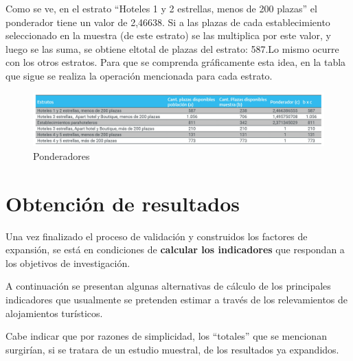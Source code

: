 \documentclass[
]{book}
\begin{document}
Como se ve, en el estrato ``Hoteles 1 y 2 estrellas, menos de 200 plazas'' el ponderador tiene un valor de 2,46638. Si a las plazas de cada establecimiento seleccionado en la muestra (de este estrato) se las multiplica por este valor, y luego se las suma, se obtiene eltotal de plazas del estrato: 587.Lo mismo ocurre con los otros estratos. Para que se comprenda gráficamente esta idea, en la tabla que sigue se realiza la operación mencionada para cada estrato.

\begin{figure}

{\centering \includegraphics[width=0.8\linewidth]{imagenes/tabla_7b} 

}

\caption{Ponderadores}\label{fig:tabla7A}
\end{figure}

\hypertarget{obtenciuxf3n-de-resultados}{%
\section{Obtención de resultados}\label{obtenciuxf3n-de-resultados}}

Una vez finalizado el proceso de validación y construidos los factores de expansión, se está en condiciones de \textbf{calcular los indicadores} que respondan a los objetivos de investigación.

A continuación se presentan algunas alternativas de cálculo de los principales indicadores que usualmente se pretenden estimar a través de los relevamientos de alojamientos turísticos.

Cabe indicar que por razones de simplicidad, los ``totales'' que se mencionan surgirían, si se tratara de un estudio muestral, de los resultados ya expandidos.
\end{document}
